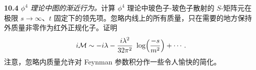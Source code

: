 \textbf{10.4} \emph{$\phi^4$ 理论中图的渐近行为。}计算 $\phi^4$ 理论中玻色子-玻色子散射的 $S$-矩阵元在极限 $s\to\infty$、$t$ 固定下的领先项。忽略内线上的所有质量，只在需要的地方保持外质量非零作为红外正规化子。证明
\begin{equation}
  i\mathcal{M} \sim -i\lambda - \frac{i\lambda^2}{32\pi^2}\ \log\Bigl(
    \frac{-s}{m^2} \Bigr) + \cdots .
\end{equation}
注意，忽略内质量允许对 Feynman 参数积分作一些令人愉快的简化。
